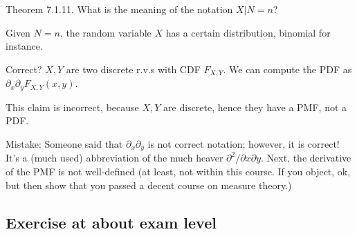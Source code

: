 \documentclass[assignments]{subfiles}
\begin{document}
\begin{exercise}
Theorem 7.1.11. What is the meaning of the notation $X|N=n$?
\begin{solution}
  Given $N=n$, the random variable $X$ has a certain distribution, binomial for instance.
\end{solution}
\end{exercise}

\begin{exercise}
Correct? $X, Y$ are two discrete r.v.s with CDF $F_{X,Y}$. We can compute the PDF as $\partial_{x}\partial_{y} F_{X,Y}(x,y)$.
\begin{solution}
This claim is incorrect, because $X, Y$ are discrete, hence they have a PMF, not a PDF.

Mistake: Someone said that $\partial_{x}\partial_{y}$ is not correct notation; however, it is correct! It's a (much used) abbreviation of the much heaver $\partial^{2}/\partial x \partial y$. Next, the derivative of the PMF is not well-defined (at least, not within this course. If you object, ok, but then show that you passed a decent course on measure theory.)
\end{solution}
\end{exercise}


\subsection{Exercise at about exam level}
\label{sec:below-exam-level}
\end{document}
